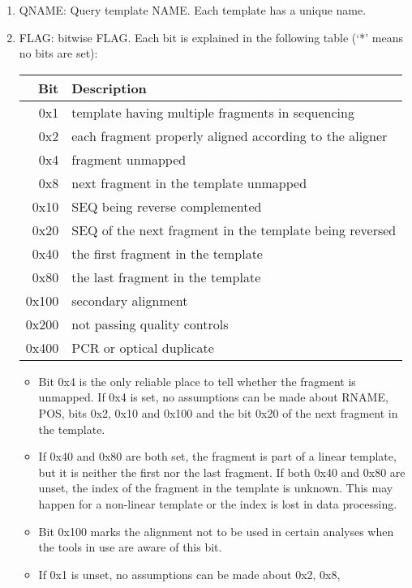 \documentclass[10pt]{article}
\begin{document}
\begin{enumerate}
\item {\sf QNAME}: Query template NAME. Each template has a unique name.
\item {\sf FLAG}: bitwise FLAG. Each bit is explained in the following
  table (`*' means no bits are set):
  \begin{center}\small
  \begin{tabular}{rl}
  \hline
  Bit & Description\\
  \hline
  0x1 &  template having multiple fragments in sequencing \\
  0x2 &  each fragment properly aligned according to the aligner \\
  0x4 &  fragment unmapped \\
  0x8 &  next fragment in the template unmapped \\
  0x10 &  {\sf SEQ} being reverse complemented \\
  0x20 &  {\sf SEQ} of the next fragment in the template being reversed \\
  0x40 &  the first fragment in the template \\
  0x80 &  the last fragment in the template \\
  0x100 &  secondary alignment\\
  0x200 &  not passing quality controls \\
  0x400 &  PCR or optical duplicate \\
  \hline
  \end{tabular}
  \end{center}
  \begin{itemize}
  \item Bit 0x4 is the only reliable place to tell whether the fragment
    is unmapped. If 0x4 is set, no assumptions can be made about {\sf
      RNAME}, {\sf POS}, bits 0x2, 0x10 and 0x100 and the bit 0x20 of
    the next fragment in the template.
  \item If 0x40 and 0x80 are both set, the fragment is part of a linear
    template, but it is neither the first nor the last fragment. If both
    0x40 and 0x80 are unset, the index of the fragment in the template
    is unknown. This may happen for a non-linear template or the index
    is lost in data processing.
  \item Bit 0x100 marks the alignment not to be used in certain analyses
    when the tools in use are aware of this bit.
  \item If 0x1 is unset, no assumptions can be made about 0x2, 0x8,

\end{itemize}
\end{enumerate}
\end{document}

